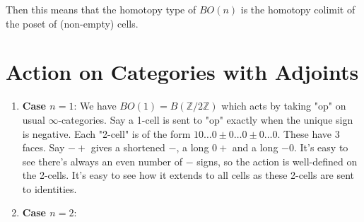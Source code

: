 \documentclass{article}
\begin{document}
Then this means that the homotopy type of $BO(n)$ is the homotopy colimit of the poset of (non-empty) cells.

\section{Action on Categories with Adjoints}
\begin{enumerate}
    \item \textbf{Case $n=1$}: We have $BO(1) = B(\mathbb{Z}/2\mathbb{Z})$ which acts by taking "op" on usual $\infty$-categories.
    Say a 1-cell is sent to "op" exactly when the unique sign is negative.
    Each "2-cell" is of the form $10\ldots0\pm0\ldots0\pm0\ldots0$.
    These have 3 faces.
    Say $-+$ gives a shortened $-$, a long $0+$ and a long $-0$.
    It's easy to see there's always an even number of $-$ signs, so the action is well-defined on the 2-cells.
    It's easy to see how it extends to all cells as these 2-cells are sent to identities.

    \item \textbf{Case $n=2$}:
\end{enumerate}
\end{document}
